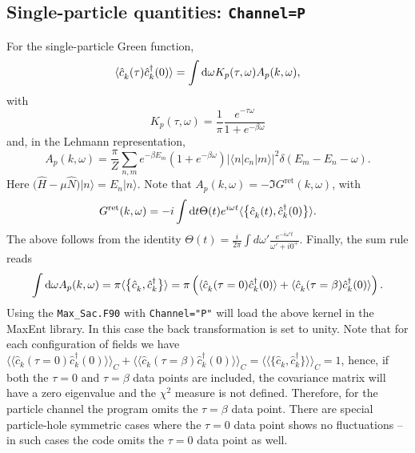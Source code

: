 \subsection{Single-particle quantities: \texttt{Channel=P}}
For the single-particle Green function, 
\begin{equation} 
	\langle \hat{c}^{\phantom\dagger}_{k} (\tau)  \hat{c}^{\dagger}_{k} (0)   \rangle   = \int \d \omega  K_p(\tau,\omega)   A_p(k, \omega) ,
\end{equation}
with 
\begin{equation}
K_{p}(\tau,\omega) =    \frac{1}{\pi} \frac{e^{-\tau \omega} }  {  1 + e^{-\beta\omega} }
\end{equation}
and, in the Lehmann representation, 
 \begin{equation}
   A_p(k, \omega) = \frac{ \pi}{Z} \sum_{n,m} e^{-\beta E_m } \left( 1 + e^{-\beta \omega}\right) | \langle n | c_n | m  \rangle |^{2} \delta \left( E_m - E_n - \omega \right)  .
\end{equation}  
Here $ \big( \hat{H} - \mu \hat{N} \big) | n \rangle = E_n | n \rangle  $.
Note that  $ A_p(k, \omega)  = - \Im G^{\mathrm{ret}} (k, \omega) $,  with 
\begin{equation}
	G^{\mathrm{ret}} (k, \omega)  = -i \int \d t \Theta(t)  e^{i \omega t} \langle \big\{ \hat{c}^{\phantom\dagger}_{k} (t), \hat{c}^{\dagger}_{k} (0) \big\} \rangle .
\end{equation}
The above follows from  the identity $\Theta(t) =  \frac{i}{2\pi} \int d \omega'  \frac{e^{-i \omega' t}}{\omega' + i 0^{+}} $.
Finally, the sum rule reads
\begin{equation}
	\int \d \omega  A_p(k, \omega)  = \pi \langle  \big\{ \hat{c}^{\phantom\dagger}_{k} , \hat{c}^{\dagger}_{k}  \big\}   \rangle = \pi \left( 
	\langle \hat{c}^{\phantom\dagger}_{k} (\tau=0)  \hat{c}^{\dagger}_{k} (0)   \rangle  +  \langle \hat{c}^{\phantom\dagger}_{k} (\tau=\beta)  \hat{c}^{\dagger}_{k} (0)   \rangle  \right).
\end{equation}
Using the \texttt{Max\_Sac.F90}  with \texttt{Channel="P"}   will  load the above kernel in the MaxEnt library. In this case the back  transformation is set to unity.  
Note that for each  configuration of fields we have $ \langle  \langle \hat{c}^{\phantom\dagger}_{k} (\tau=0)  \hat{c}^{\dagger}_{k} (0)   \rangle  \rangle_{C} +   
\langle \langle \hat{c}^{\phantom\dagger}_{k} (\tau=\beta)  \hat{c}^{\dagger}_{k} (0)   \rangle \rangle_{C} = 
\langle \langle \big\{ \hat{c}^{\phantom\dagger}_{k},   \hat{c}^{\dagger}_{k}    \big\} \rangle \rangle_{C}   = 1$, hence, 
if both  the $\tau=0$ and $\tau=\beta$ data points are included, the covariance matrix will have a zero eigenvalue and the $\chi^{2}$ measure is not defined. 
Therefore, for the particle channel the program omits the $\tau=\beta$ data point. There are special  particle-hole symmetric  cases where the $\tau=0$ data 
point shows no  fluctuations -- in such cases the code omits the $\tau=0$ data point as well.

